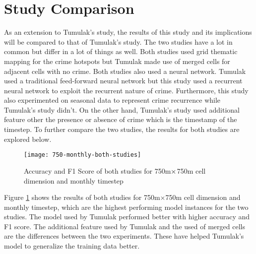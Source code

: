 \section{Study Comparison}

	As an extension to Tumulak's study, the results of this study and its implications will be compared to that of Tumulak's study. The two studies have a lot in common but differ in a lot of things as well. Both studies used grid thematic mapping for the crime hotspots but Tumulak made use of merged cells for adjacent cells with no crime. Both studies also used a neural network. Tumulak used a traditional feed-forward neural network but this study used a recurrent neural network to exploit the recurrent nature of crime. Furthermore, this study also experimented on seasonal data to represent crime recurrence while Tumulak's study didn't. On the other hand, Tumulak's study used additional feature other the presence or absence of crime which is the timestamp of the timestep. To further compare the two studies, the results for both studies are explored below.

	\begin{figure}[H]
      \centering
      \texttt{[image: 750-monthly-both-studies]}
      \caption{Accuracy and F1 Score of both studies for 750m$\protect\times$750m cell dimension and monthly timestep}
      \label{750-monthly-both-studies}
    \end{figure}

    Figure \ref{750-monthly-both-studies} shows the results of both studies for 750m\(\times\)750m cell dimension and monthly timestep, which are the highest performing model instances for the two studies. The model used by Tumulak performed better with higher accuracy and F1 score. The additional feature used by Tumulak and the used of merged cells are the differences between the two experiments. These have helped Tumulak's model to generalize the training data better.
